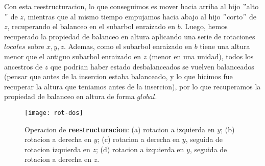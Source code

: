 \documentclass[10pt,a4paper]{article}
\begin{document}
\newline
\newline
Con esta reestructuracion, lo que conseguimos es mover hacia arriba al hijo $"$alto$"$ de $z$, mientras que al mismo tiempo empujamos hacia abajo al hijo $"$corto$"$ de $z$, recuperando el balanceo en el subarbol enraizado en $b$. Luego, hemos recuperado la propiedad de balanceo en altura aplicando una serie de rotaciones $locales$ sobre $x, y, z$. Ademas, como el subarbol enraizado en $b$ tiene una altura menor que el antiguo subarbol enraizado en $z$ (menor en una unidad), todos los ancestros de $z$ que podrian haber estado desbalanceados se vuelven balanceados (pensar que antes de la insercion estaba balanceado, y lo que hicimos fue recuperar la altura que teniamos antes de la insercion), por lo que recuperamos la propiedad de balanceo en altura de forma $global$.
\newpage
\begin{figure}[h]
	\centering
	\texttt{[image: rot-dos]}
	\caption{Operacion de \textbf{reestructuracion}: (a) rotacion a izquierda en $y$; (b) rotacion a derecha en $y$; (c) rotacion a derecha en $y$, seguida de rotacion izquierda en $z$; (d) rotacion a izquierda en $y$, seguida de rotacion a derecha en $z$.}
	\label{drivers1}
\end{figure}
\end{document}
